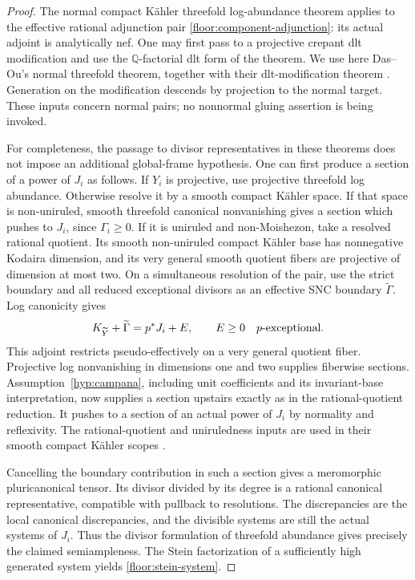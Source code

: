 \documentclass[11pt,letterpaper]{article}
\newcommand{\Q}{\mathbb{Q}}
\theoremstyle{definition}
\theoremstyle{remark}
\begin{document}
\begin{proof}
The normal compact K\"ahler threefold log-abundance theorem applies to
the effective rational adjunction pair
\eqref{floor:component-adjunction}: its actual adjoint is analytically
nef.  One may first pass to a projective crepant dlt modification and
use the $\Q$-factorial dlt form of the theorem.  We use here
Das--Ou's normal threefold theorem, together with their dlt-modification
theorem \cite[Corollary~1.3]{DasOuAbundanceII}
\cite[Theorem~5.2]{DasOuAbundanceI}.  Generation on the modification
descends by projection to the normal target.  These inputs concern
normal pairs; no nonnormal gluing assertion is being invoked.

For completeness, the passage to divisor representatives in these
theorems does not impose an additional global-frame hypothesis.  One
can first produce a section of a power of $J_i$ as follows.  If $Y_i$
is projective, use projective threefold log abundance.  Otherwise
resolve it by a smooth compact K\"ahler space.  If that space is
non-uniruled, smooth threefold canonical nonvanishing gives a section
which pushes to $J_i$, since $\Gamma_i\ge0$.  If it is uniruled and
non-Moishezon, take a resolved rational quotient.  Its smooth
non-uniruled compact K\"ahler base has nonnegative Kodaira dimension,
and its very general smooth quotient fibers are projective of
dimension at most two.  On a simultaneous resolution of the pair,
use the strict boundary and all reduced exceptional divisors as an
effective SNC boundary $\widetilde\Gamma$.  Log canonicity gives
\[
 K_{\widetilde Y}+\widetilde\Gamma
   =p^*J_i+E,\qquad E\ge0\quad\hbox{$p$-exceptional}.
\]
This adjoint restricts pseudo-effectively on a very general quotient
fiber.  Projective log nonvanishing in dimensions one and two supplies
fiberwise sections.  Assumption~\ref{hyp:campana}, including unit
coefficients and its invariant-base interpretation, now supplies a
section upstairs exactly as in the rational-quotient reduction.  It
pushes to a section of an actual power of $J_i$ by normality and
reflexivity.  The rational-quotient and uniruledness inputs are used in
their smooth compact K\"ahler scopes
\cite{CampanaRationalQuotient,OuUniruledness}.

Cancelling the boundary contribution in such a section gives a
meromorphic pluricanonical tensor.  Its divisor divided by its degree
is a rational canonical representative, compatible with pullback to
resolutions.  The discrepancies are the local canonical
discrepancies, and the divisible systems are still the actual
systems of $J_i$.  Thus the divisor formulation of threefold
abundance gives precisely the claimed semiampleness.  The Stein
factorization of a sufficiently high generated system yields
\eqref{floor:stein-system}.
\end{proof}
\end{document}
